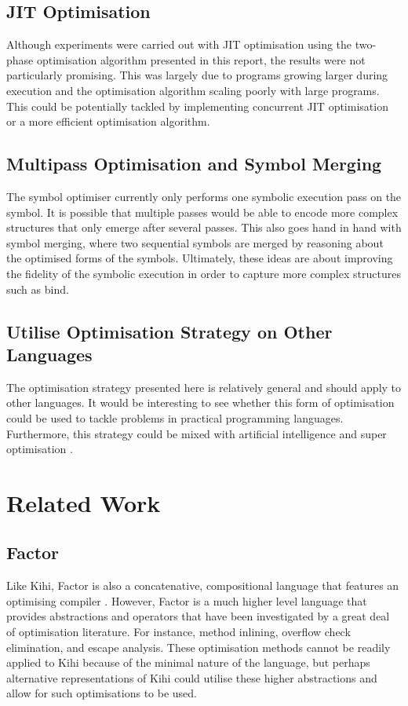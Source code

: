 \subsection{JIT Optimisation}
Although experiments were carried out with JIT optimisation using the two-phase optimisation algorithm presented in this report, the results were not particularly promising. This was largely due to programs growing larger during execution and the optimisation algorithm scaling poorly with large programs. This could be potentially tackled by implementing concurrent JIT optimisation or a more efficient optimisation algorithm.

\subsection{Multipass Optimisation and Symbol Merging}
The symbol optimiser currently only performs one symbolic execution pass on the symbol. It is possible that multiple passes would be able to encode more complex structures that only emerge after several passes. This also goes hand in hand with symbol merging, where two sequential symbols are merged by reasoning about the optimised forms of the symbols. Ultimately, these ideas are about improving the fidelity of the symbolic execution in order to capture more complex structures such as bind.

\subsection{Utilise Optimisation Strategy on Other Languages}
The optimisation strategy presented here is relatively general and should apply to other languages. It would be interesting to see whether this form of optimisation could be used to tackle problems in practical programming languages. Furthermore, this strategy could be mixed with artificial intelligence and super optimisation \cite{singh2017ap}\cite{auler2011superoptimization}.

\section{Related Work}
\subsection{Factor}
Like Kihi, Factor is also a concatenative, compositional language that features an optimising compiler \cite{pestov2010factor}. However, Factor is a much higher level language that provides abstractions and operators that have been investigated by a great deal of optimisation literature. For instance, method inlining, overflow check elimination, and escape analysis. These optimisation methods cannot be readily applied to Kihi because of the minimal nature of the language, but perhaps alternative representations of Kihi could utilise these higher abstractions and allow for such optimisations to be used.

